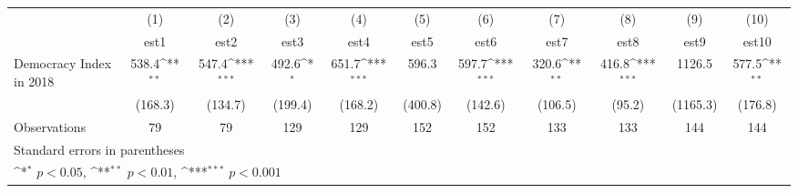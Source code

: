 {
\def\sym#1{\ifmmode^{#1}\else\(^{#1}\)\fi}
\begin{tabular}{l*{10}{c}}
\hline\hline
                    &\multicolumn{1}{c}{(1)}         &\multicolumn{1}{c}{(2)}         &\multicolumn{1}{c}{(3)}         &\multicolumn{1}{c}{(4)}         &\multicolumn{1}{c}{(5)}         &\multicolumn{1}{c}{(6)}         &\multicolumn{1}{c}{(7)}         &\multicolumn{1}{c}{(8)}         &\multicolumn{1}{c}{(9)}         &\multicolumn{1}{c}{(10)}         \\
                    &        est1         &        est2         &        est3         &        est4         &        est5         &        est6         &        est7         &        est8         &        est9         &       est10         \\
\hline
Democracy Index in 2018&       538.4\sym{**} &       547.4\sym{***}&       492.6\sym{*}  &       651.7\sym{***}&       596.3         &       597.7\sym{***}&       320.6\sym{**} &       416.8\sym{***}&      1126.5         &       577.5\sym{**} \\
                    &     (168.3)         &     (134.7)         &     (199.4)         &     (168.2)         &     (400.8)         &     (142.6)         &     (106.5)         &      (95.2)         &    (1165.3)         &     (176.8)         \\
\hline
Observations        &          79         &          79         &         129         &         129         &         152         &         152         &         133         &         133         &         144         &         144         \\
\hline\hline
\multicolumn{11}{l}{\footnotesize Standard errors in parentheses}\\
\multicolumn{11}{l}{\footnotesize \sym{*} \(p<0.05\), \sym{**} \(p<0.01\), \sym{***} \(p<0.001\)}\\
\end{tabular}
}

